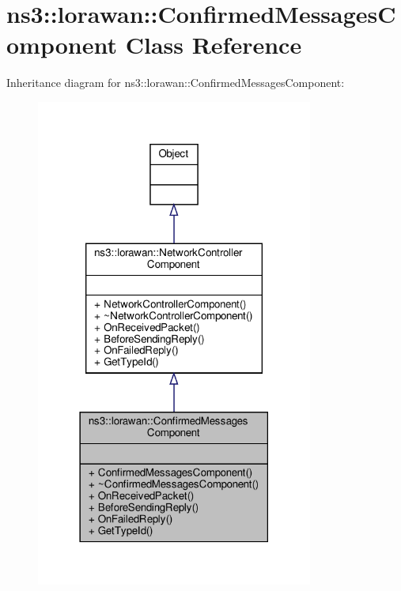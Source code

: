 \hypertarget{classns3_1_1lorawan_1_1ConfirmedMessagesComponent}{}\section{ns3\+:\+:lorawan\+:\+:Confirmed\+Messages\+Component Class Reference}
\label{classns3_1_1lorawan_1_1ConfirmedMessagesComponent}


Inheritance diagram for ns3\+:\+:lorawan\+:\+:Confirmed\+Messages\+Component\+:
\nopagebreak
\begin{figure}[H]
\begin{center}
\leavevmode
\includegraphics[width=258pt]{classns3_1_1lorawan_1_1ConfirmedMessagesComponent__inherit__graph}
\end{center}
\end{figure}


